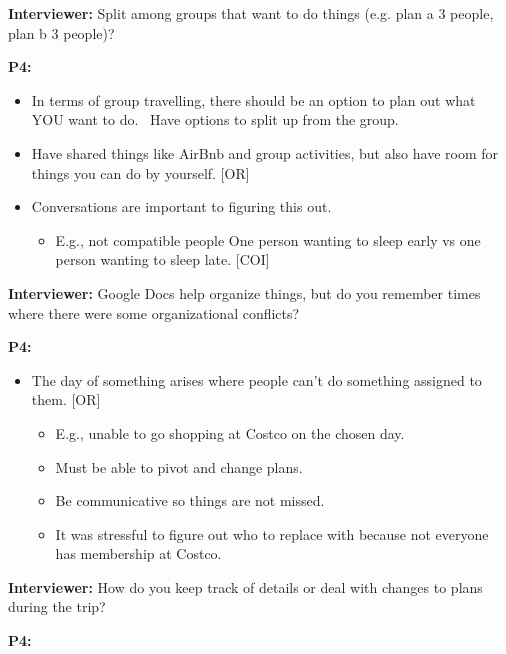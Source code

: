 \documentclass[12pt,a4paper]{article}
\begin{document}
\textbf{Interviewer: }Split among groups that want to do things (e.g. plan a 3 people, plan b 3 people)? 

\textbf{P4:}

\begin{itemize}
    \item In terms of group travelling, there should be an option to plan out what YOU want to do. 
Have options to split up from the group. 

    \item Have shared things like AirBnb and group activities, but also have room for things you can do by yourself. [OR]
    \item Conversations are important to figuring this out. 
    \begin{itemize}
        \item E.g., not compatible people
One person wanting to sleep early vs one person wanting to sleep late. [COI]

    \end{itemize}
\end{itemize}

\textbf{Interviewer: }Google Docs help organize things, but do you remember times where there were some organizational conflicts?  

\textbf{P4:}

\begin{itemize}
    \item The day of something arises where people can’t do something assigned to them. [OR] 
    \begin{itemize}
        \item E.g., unable to go shopping at Costco on the chosen day.
        \item Must be able to pivot and change plans.
        \item Be communicative so things are not missed. 
        \item It was stressful to figure out who to replace with because not everyone has membership at Costco. 
    \end{itemize}
\end{itemize}

\textbf{Interviewer: }How do you keep track of details or deal with changes to plans during the trip?  

\textbf{P4:}
\end{document}
